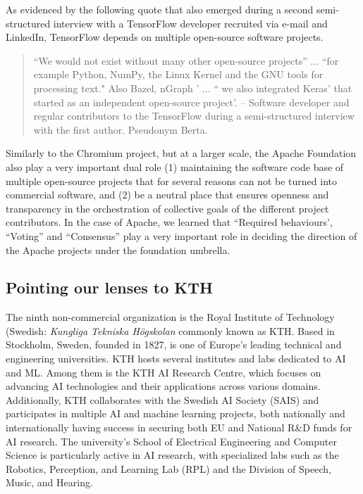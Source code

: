 \documentclass[CHICAGO,Times1COL]{WileyNJDv5} %
\begin{document}
 
As evidenced by the following quote that also emerged during a second semi-structured interview with a TensorFlow developer recruited via e-mail and LinkedIn, TensorFlow depends on multiple open-source software projects. 

\begin{quotation}
``We would not exist without many other open-source projects'' ... ``for example Python, NumPy, the Linux Kernel and the GNU tools for processing text." Also Bazel, nGraph ' ... `` we also integrated Keras' that started as an independent open-source project'.   -- Software developer  and regular contributors to the TensorFlow during a semi-structured interview with the first author.  Pseudonym Berta. 
\end{quotation}


Similarly to the Chromium project, but at a larger scale, the Apache Foundation also play a very important dual role (1) maintaining the software code base of multiple open-source projects that for several reasons can not be turned into commercial software, and (2) be a neutral place that ensures openness and transparency in the orchestration of collective goals of the different project contributors. In the case of Apache, we learned that ``Required behaviours', ``Voting'' and ``Consensus'' play a very important role in deciding the direction of the Apache projects under the foundation umbrella. 






\subsection{Pointing our lenses to KTH}


The ninth non-commercial organization is the Royal Institute of Technology (Swedish: \textit{Kungliga Tekniska Högskolan} commonly known as KTH. Based in Stockholm, Sweden, founded in 1827, is one of Europe's leading technical and engineering universities.  KTH hosts several institutes and labs dedicated to \ac{AI} and \ac{ML}. Among them is the KTH AI Research Centre, which focuses on advancing AI technologies and their applications across various domains. Additionally, KTH collaborates with the Swedish AI Society (SAIS) and participates in multiple AI and machine learning projects, both nationally and internationally having success in securing both EU  and National R\&D funds for AI research.  
The university's School of Electrical Engineering and Computer Science is particularly active in AI research, with specialized labs such as the Robotics, Perception, and Learning Lab (RPL) and the Division of Speech, Music, and Hearing. 
\end{document}
